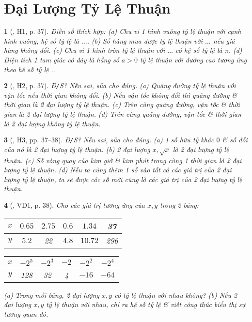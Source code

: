 \documentclass{article}
\newtheorem{baitoan}{}
\begin{document}

\section{Đại Lượng Tỷ Lệ Thuận}

\begin{baitoan}[\cite{Binh_boi_duong_Toan_7_tap_1}, H1, p. 37]
	Điền số thích hợp: (a) Chu vi 1 hình vuông tỷ lệ thuận với cạnh hình vuông, hệ số tỷ lệ là $\ldots$. (b) Số hàng mua được tỷ lệ thuận với $\ldots$ nếu giá hàng không đổi. (c) Chu vi 1 hình tròn tỷ lệ thuận với $\ldots$ có hệ số tỷ lệ là $\pi$. (d) Diện tích 1 tam giác có đáy là hằng số $a > 0$ tỷ lệ thuận với đường cao tương ứng theo hệ số tỷ lệ $\ldots$
\end{baitoan}

\begin{baitoan}[\cite{Binh_boi_duong_Toan_7_tap_1}, H2, p. 37]
	{\rm Đ{\tt/}S?} Nếu sai, sửa cho đúng. (a) Quãng đường tỷ lệ thuận với vận tốc nếu thời gian không đổi. (b) Nếu vận tốc không đổi thì quãng đường \& thời gian là 2 đại lượng tỷ lệ thuận. (c) Trên cùng quãng đường, vận tốc \& thời gian là 2 đại lượng tỷ lệ thuận. (d) Trên cùng quãng đường, vận tốc \& thời gian là 2 đại lượng không tỷ lệ thuận.
\end{baitoan}

\begin{baitoan}[\cite{Binh_boi_duong_Toan_7_tap_1}, H3, pp. 37--38]
	{\rm Đ{\tt/}S?} Nếu sai, sửa cho đúng. (a) 1 số hữu tỷ khác $0$ \& số đối của nó là 2 đại lượng tỷ lệ thuận. (b) 2 đại lượng $x,\sqrt{x}$ là 2 đại lượng tỷ lệ thuận. (c) Số vòng quay của kim giờ \& kim phút trong cùng 1 thời gian là 2 đại lượng tỷ lệ thuận. (d) Nếu ta cùng thêm 1 số vào tất cả các giá trị của 2 đại lượng tỷ lệ thuận, ta sẽ được các số mới cũng là các giá trị của 2 đại lượng tỷ lệ thuận.
\end{baitoan}

\begin{baitoan}[\cite{Binh_boi_duong_Toan_7_tap_1}, VD1, p. 38]
	Cho các giá trị tương ứng của $x,y$ trong 2 bảng:
	\begin{table}[H]
		\centering
		\begin{tabular}{|c|c|c|c|c|c|}
			\hline
			$x$ & $0.65$ & $2.75$ & $0.6$ & $1.34$ & 37 \\
			\hline
			$y$ & $5.2$ & 22 & $4.8$ & $10.72$ & 296 \\
			\hline
		\end{tabular}\hspace{1cm}
		\begin{tabular}{|c|c|c|c|c|c|}
			\hline
			$x$ & $-2^5$ & $-2^3$ & $-2$ & $-2^2$ & $-2^4$ \\
			\hline
			$y$ & 128 & 32 & 4 & $-16$ & $-64$ \\
			\hline
		\end{tabular}
	\end{table}
	\noindent(a) Trong mỗi bảng, 2 đại lượng $x,y$ có tỷ lệ thuận với nhau không? (b) Nếu 2 đại lượng $x,y$ tỷ lệ thuận với nhau, chỉ ra hệ số tỷ lệ \& viết công thức biểu thị sự tương quan đó.
\end{baitoan}
\end{document}
